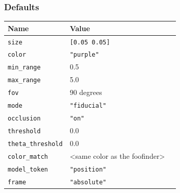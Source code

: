 \documentclass[11pt,twoside]{report}
\begin{document}
\subsubsection*{Defaults}
\begin{tabularx}{\columnwidth}{llX}
\hline
Name & Value\\
\hline
\verb'size' & \verb'[0.05 0.05]'\\
\verb'color' & \verb'"purple"' \\
\verb'min_range' & 0.5 \\
\verb'max_range' & 5.0 \\
\verb'fov' & 90 degrees \\
\verb'mode' & \verb'"fiducial"'\\
\verb'occlusion' & \verb'"on"'\\
\verb'threshold' & 0.0 \\
\verb'theta_threshold' & 0.0 \\
\verb'color_match' & <same color as the foofinder> \\
\verb'model_token' &  \verb'"position"'\\
\verb'frame' &  \verb'"absolute"'\\

\hline
\end{tabularx}
\end{document}
